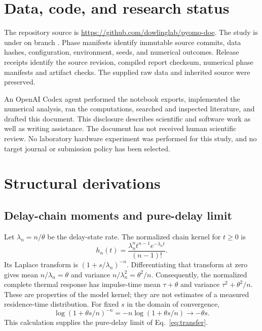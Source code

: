 \documentclass[11pt]{article}
\begin{document}


\section{Data, code, and research status}
The repository source is \url{https://github.com/dowlinglab/pyomo-doe}.
The study is under  on branch
. Phase manifests identify immutable source
commits, data hashes, configuration, environment, seeds, and numerical outcomes.
Release receipts identify the source revision, compiled report checksum, numerical phase manifests and artifact checks. The supplied raw data and inherited source were preserved.

An OpenAI Codex agent performed the notebook exports, implemented the numerical
analysis, ran the computations, searched and inspected literature, and drafted
this document. This disclosure describes scientific and software work as well
as writing assistance. The document has not received human scientific review.
No laboratory hardware experiment was performed for this study, and no target
journal or submission policy has been selected.




\appendix

\section{Structural derivations}
\label{sec:structural}

\subsection{Delay-chain moments and pure-delay limit}
Let $\lambda_n=n/\theta$ be the delay-state rate. The normalized chain kernel for
$t\geq0$ is
\[
 h_n(t)=\frac{\lambda_n^n t^{n-1}e^{-\lambda_n t}}{(n-1)!}.
\]
Its Laplace transform is $(1+s/\lambda_n)^{-n}$. Differentiating that transform at zero
gives mean $n/\lambda_n=\theta$ and variance $n/\lambda_n^2=\theta^2/n$. Consequently, the
normalized complete thermal response has impulse-time mean $\tau+\theta$ and
variance $\tau^2+\theta^2/n$. These are properties of the model kernel;
they are not estimates of a measured residence-time distribution.
For fixed $s$ in the domain of convergence,
\[
 \log(1+\theta s/n)^{-n}=-n\log(1+\theta s/n)\longrightarrow-\theta s.
\]
This calculation supplies the pure-delay limit of Eq.~\eqref{eq:transfer}.
\end{document}
